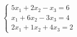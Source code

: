 \documentclass[preview]{standalone}
\begin{document}
\begin{align*}
\begin{cases}5x_1 + 2x_2 - x_3 = 6 \\x_1 + 6x_2 - 3x_3 = 4 \\2x_1 + 1x_2 + 4x_3 = 2\end{cases}
\end{align*}
\end{document}

